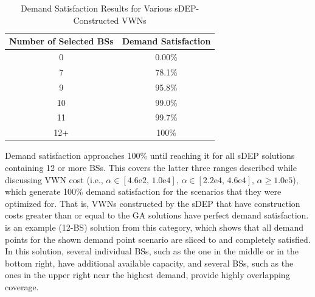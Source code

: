 \documentclass[12pt,dvipsnames]{report}
\newcommand{\expnumber}[2]{{#1}\mathrm{e}{#2}}
\begin{document}
\begin{table}[htp]
	\centering
	\caption[Preliminary Simulation Demand Satisfaction of sDEP-Constructed VWNs]{Demand Satisfaction Results for Various sDEP-Constructed VWNs}
	\begin{tabular}{|c|c|} 
		\hline
		\textbf{Number of Selected BSs} & \textbf{Demand Satisfaction} \\
		\hline
		0 & 0.00\% \\
		\hline
		7 & 78.1\% \\
		\hline
		9 & 95.8\% \\
		\hline
		10 & 99.0\% \\
		\hline
		11 & 99.7\% \\
		\hline
		12+ & 100\% \\
		\hline
	\end{tabular}
	\label{tab:Prelim_sDEPDemandSatisfaction}
\end{table}

Demand satisfaction approaches 100\% until reaching it for all sDEP solutions containing 12 or more BSs.  This covers the latter three ranges described while discussing VWN cost (i.e., $\alpha \in \left[ \expnumber{4.6}{2},\, \expnumber{1.0}{4} \right],\, \alpha \in \left[ \expnumber{2.2}{4},\, \expnumber{4.6}{4} \right],\, \alpha \geq \expnumber{1.0}{5}$), which generate 100\% demand satisfaction for the scenarios that they were optimized for.  That is, VWNs constructed by the sDEP that have construction costs greater than or equal to the GA solutions have perfect demand satisfaction.   is an example (12-BS) solution from this category, which shows that all demand points for the shown demand point scenario are sliced to and completely satisfied.  In this solution, several individual BSs, such as the one in the middle or in the bottom right, have additional available capacity, and several BSs, such as the ones in the upper right near the highest demand, provide highly overlapping coverage.
\end{document}
